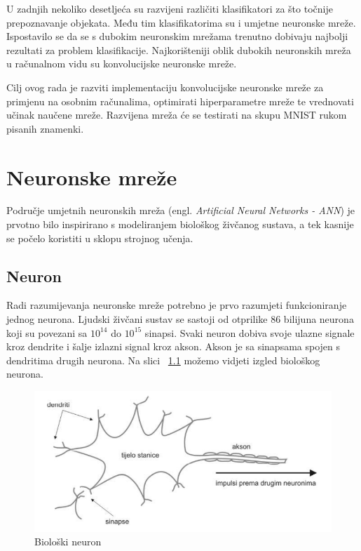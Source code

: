 \documentclass[times, utf8, zavrsni, numeric]{fer}
\begin{document}
U zadnjih nekoliko desetljeća su razvijeni različiti klasifikatori za što točnije prepoznavanje objekata. Među tim klasifikatorima su i umjetne neuronske mreže. Ispostavilo se da se s dubokim neuronskim mrežama trenutno dobivaju najbolji rezultati za problem klasifikacije. Najkorišteniji oblik dubokih neuronskih mreža u računalnom vidu su konvolucijske neuronske mreže.

Cilj ovog rada je razviti implementaciju konvolucijske neuronske mreže za primjenu na osobnim računalima, optimirati hiperparametre mreže te vrednovati učinak naučene mreže. Razvijena mreža će se testirati na skupu MNIST rukom pisanih znamenki.
\chapter{Neuronske mreže}
Područje umjetnih neuronskih mreža (engl. \textit{Artificial Neural Networks - ANN}) je prvotno bilo inspirirano s modeliranjem biološkog živčanog sustava, a tek kasnije se počelo koristiti u sklopu strojnog učenja. 
\section{Neuron}
Radi razumijevanja neuronske mreže potrebno je prvo razumjeti funkcioniranje jednog neurona. Ljudski živčani sustav se sastoji od otprilike 86 bilijuna neurona koji su povezani sa $10^{14}$ do $10^{15}$ sinapsi. Svaki neuron dobiva svoje ulazne signale kroz dendrite i šalje izlazni signal kroz akson. Akson je sa sinapsama spojen s dendritima drugih neurona. Na slici ~\ref{fig:bio-neuron} možemo vidjeti izgled biološkog neurona.
\begin{figure}
    \centering
    \includegraphics[width=12cm]{img/bio-neuron.png}
    \caption{Biološki neuron}
    \label{fig:bio-neuron}
\end{figure}
\end{document}
